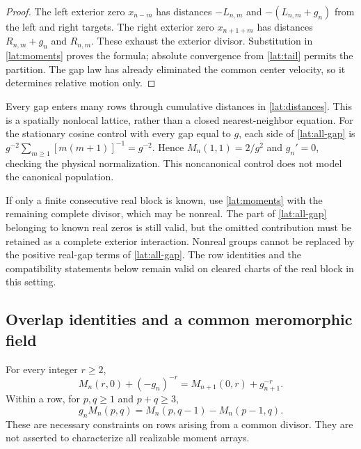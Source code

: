 \begin{proof}
The left exterior zero $x_{n-m}$ has distances $-L_{n,m}$ and
$-(L_{n,m}+g_n)$ from the left and right targets. The right exterior
zero $x_{n+1+m}$ has distances $R_{n,m}+g_n$ and $R_{n,m}$.
These exhaust the exterior divisor. Substitution in
\eqref{lat:moments} proves the formula; absolute convergence from
\eqref{lat:tail} permits the partition. The gap law has already
eliminated the common center velocity, so it determines relative
motion only.
\end{proof}

Every gap enters many rows through cumulative distances in
\eqref{lat:distances}. This is a spatially nonlocal lattice, rather
than a closed nearest-neighbor equation. For the stationary cosine
control with every gap equal to $g$, each side of
\eqref{lat:all-gap} is
$g^{-2}\sum_{m\ge1}[m(m+1)]^{-1}=g^{-2}$. Hence
$M_n(1,1)=2/g^2$ and $g_n'=0$, checking the physical normalization.
This noncanonical control does not model the canonical population.

If only a finite consecutive real block is known, use
\eqref{lat:moments} with the remaining complete divisor, which may
be nonreal. The part of \eqref{lat:all-gap} belonging to known real
zeros is still valid, but the omitted contribution must be retained
as a complete exterior interaction. Nonreal groups cannot be replaced
by the positive real-gap terms of \eqref{lat:all-gap}. The row
identities and the compatibility statements below remain valid on
cleared charts of the real block in this setting.

\subsection{Overlap identities and a common meromorphic field}

\begin{proposition}\label{lat:compat-prop}
For every integer $r\ge2$,
\begin{equation}
 M_n(r,0)+(-g_n)^{-r}
 =M_{n+1}(0,r)+g_{n+1}^{-r}.
 \label{lat:overlap}
\end{equation}
Within a row, for $p,q\ge1$ and $p+q\ge3$,
\begin{equation}
 g_nM_n(p,q)=M_n(p,q-1)-M_n(p-1,q).
 \label{lat:row-algebra}
\end{equation}
These are necessary constraints on rows arising from a common divisor.
They are not asserted to characterize all realizable moment arrays.
\end{proposition}

